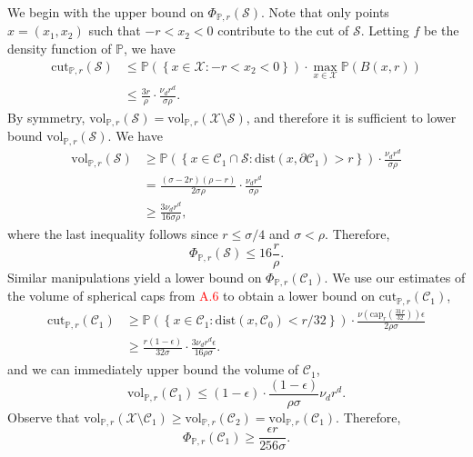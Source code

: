 \documentclass[11pt,twoside]{article}
\newcommand{\set}[1]{\left\{#1\right\}}
\newcommand{\vol}{\mathrm{vol}}
\newcommand{\cut}{\mathrm{cut}}
\newcommand{\1}{\mathbf{1}}
\newcommand{\dist}{\mathrm{dist}}
\newcommand{\Pbb}{\mathbb{P}}
\newcommand{\Sset}{\mathcal{S}}
\newcommand{\Cset}{\mathcal{C}}
\begin{document}
We begin with the upper bound on $\Phi_{\Pbb,r}(\Sset)$. Note that only points $x = (x_1,x_2)$ such that $-r < x_2 < 0$ contribute to the cut of $\Sset$. Letting $f$ be the density function of $\Pbb$, we have
\begin{align*}
\cut_{\Pbb,r}(\Sset) & \leq \Pbb(\set{x \in \mathcal{X}: -r < x_2 < 0}) \cdot \max_{x \in \mathcal{X}} \Pbb(B(x,r)) \\
& \leq \frac{3 r}{\rho} \cdot \frac{\nu_d r^d}{\sigma \rho}.
\end{align*}
By symmetry, $\vol_{\Pbb,r}(\Sset) = \vol_{\Pbb,r}(\mathcal{X} \setminus \Sset)$, and therefore it is sufficient to lower bound $\vol_{\Pbb,r}(\Sset)$. We have
\begin{align*}
\vol_{\Pbb,r}(\Sset) & \geq \Pbb(\set{x \in \Cset_1 \cap \Sset: \dist(x, \partial \Cset_1) > r}) \cdot \frac{\nu_d r^d}{\sigma \rho} \\
& = \frac{(\sigma - 2r)(\rho - r)}{2 \sigma \rho} \cdot \frac{\nu_d r^d}{\sigma \rho}  \\
& \geq \frac{3\nu_d r^d}{16\sigma \rho},
\end{align*}
where the last inequality follows since $r \leq \sigma/4$ and $\sigma < \rho$. Therefore,
\begin{equation*}
\Phi_{\Pbb,r}(\Sset) \leq 16 \frac{r}{\rho}.
\end{equation*}
Similar manipulations yield a lower bound on $\Phi_{\Pbb,r}(\Cset_1)$. We use our estimates of the volume of spherical caps from \textcolor{red}{A.6} to obtain a lower bound on $\cut_{\Pbb,r}(\Cset_1)$, 
\begin{align*}
\cut_{\Pbb,r}(\Cset_1) & \geq \Pbb(\set{x \in \Cset_1: \dist(x,\Cset_0) < r/32}) \cdot \frac{\nu(\textrm{cap}_{r}(\frac{31r}{32})) \epsilon}{2\rho\sigma} \\
& \geq \frac{r (1 - \epsilon)}{32 \sigma} \cdot \frac{3 \nu_d r^d \epsilon}{16\rho\sigma}.
\end{align*}
and we can immediately upper bound the volume of $\Cset_1$,
\begin{equation*}
\vol_{\Pbb,r}(\Cset_1) \leq (1 - \epsilon) \cdot  \frac{(1 - \epsilon)}{\rho \sigma} \nu_d r^d.
\end{equation*}
Observe that $\vol_{\Pbb,r}(\mathcal{X} \setminus \Cset_1) \geq \vol_{\Pbb,r}(\Cset_2) = \vol_{\Pbb,r}(\Cset_1)$. Therefore,
\begin{equation}
\label{eqn:lb_proof_2}
\Phi_{\Pbb,r}(\Cset_1) \geq  \frac{\epsilon r}{256 \sigma}.
\end{equation}
\end{document}
